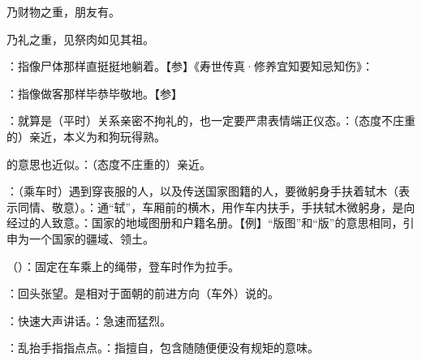 {
\item {}乃财物之重，朋友有。

乃礼之重，见祭肉如见其祖。
}
{}


{
\item {}：指像尸体那样直挺挺地躺着。【参】《寿世传真·修养宜知要知忌知伤》：%
\item {}：指像做客那样毕恭毕敬地。【参】
}
{}


{
\item {}：就算是（平时）关系亲密不拘礼的，也一定要严肃表情端正仪态。：（态度不庄重的）亲近，本义为和狗玩得熟。

的意思也近似。：（态度不庄重的）亲近。
\item {}：（乘车时）遇到穿丧服的人，以及传送国家图籍的人，要微躬身手扶着轼木（表示同情、敬意）。：通“轼”，车厢前的横木，用作车内扶手，手扶轼木微躬身，是向经过的人致意。：国家的地域图册和户籍名册。【例】“版图”和“版”的意思相同，引申为一个国家的疆域、领土。
}
{}


{
\item {}（）：固定在车乘上的绳带，登车时作为拉手。
\item {}：回头张望。是相对于面朝的前进方向（车外）说的。
\item {}：快速大声讲话。：急速而猛烈。
\item {}：乱抬手指指点点。：指擅自，包含随随便便没有规矩的意味。
}
{}


